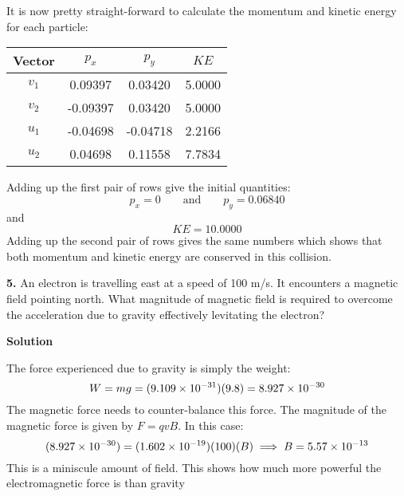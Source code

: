 \documentclass{article}
\begin{document}
It is now pretty straight-forward to calculate the momentum and
kinetic energy for each particle:


\begin{center}

\renewcommand{\arraystretch}{1.5}
\renewcommand{\tabcolsep}{0.2cm}

\begin{tabular}{cccc}
\hline
\textbf{Vector} & \textbf{$p_x$} & \textbf{$p_y$} & \textbf{$KE$} \\ 
\hline
 $v_1$ &  0.09397 &  0.03420 &  5.0000 \\ 
 $v_2$ &  -0.09397 &  0.03420 &  5.0000 \\ 
 $u_1$ &  -0.04698 &  -0.04718 &  2.2166 \\ 
 $u_2$ &  0.04698 &  0.11558 &  7.7834 \\ 
\hline
\end{tabular}



\end{center}


Adding up the first pair of rows give the initial quantities:
%
\begin{equation*}
p_x = 0 \qquad \text{and} \qquad p_y = 0.06840
\end{equation*}
and
%
\begin{equation*}
KE = 10.0000
\end{equation*}
Adding up the second pair of rows gives the same numbers which
shows that both momentum and kinetic energy are conserved in
this collision.

\textbf{5.}
\quad An electron is travelling east at a speed of 100 m/s. It encounters a magnetic field pointing north. What magnitude of magnetic field is required to overcome the acceleration due to gravity effectively levitating the electron?
\par \textbf{Solution}
\par The force experienced due to gravity is simply the weight:
%
\begin{equation*}
W = mg = (9.109 \times 10^{-31})(9.8) = 8.927 \times 10^{-30}
\end{equation*}
The magnetic force needs to counter-balance this force. The magnitude of the magnetic force is given by $F = qvB$. In this case:
%
\begin{equation*}
(8.927 \times 10^{-30}) = (1.602 \times 10^{-19})(100)(B) \implies B = 5.57 \times 10^{-13}
\end{equation*}
This is a miniscule amount of field. This shows how much more powerful the electromagnetic force is than gravity
\end{document}
